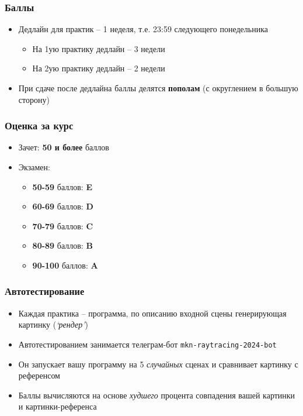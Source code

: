 \documentclass[10pt,handout]{beamer}
\begin{document}
\begin{frame}
\frametitle{Баллы}
\begin{itemize}
\item Дедлайн для практик -- 1 неделя, т.е. 23:59 следующего понедельника
\pause
\begin{itemize}
\item На 1ую практику дедлайн -- 3 недели
\item На 2ую практику дедлайн -- 2 недели
\end{itemize}
\pause
\item При сдаче после дедлайна баллы делятся \textbf{пополам} (с округлением в большую сторону)
\end{itemize}
\end{frame}

\begin{frame}
\frametitle{Оценка за курс}
\pause
\begin{itemize}
\item Зачет: \textbf{50 и более} баллов
\pause
\item Экзамен:
\begin{itemize}
\item \textbf{50-59} баллов: \textbf{E}
\item \textbf{60-69} баллов: \textbf{D}
\item \textbf{70-79} баллов: \textbf{C}
\item \textbf{80-89} баллов: \textbf{B}
\item \textbf{90-100} баллов: \textbf{A}
\end{itemize}
\end{itemize}
\end{frame}

\begin{frame}
\frametitle{Автотестирование}
\begin{itemize}
\item Каждая практика -- программа, по описанию входной сцены генерирующая картинку (\textit{`рендер'})
\pause
\item Автотестированием занимается телеграм-бот \texttt{mkn-raytracing-2024-bot}
\pause
\item Он запускает вашу программу на 5 \textit{случайных} сценах и сравнивает картинку с референсом
\pause
\item Баллы вычисляются на основе \textit{худшего} процента совпадения вашей картинки и картинки-референса
\end{itemize}
\end{frame}
\end{document}
